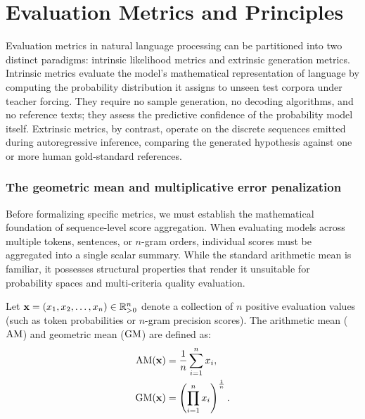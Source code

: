 \documentclass[../../main.tex]{subfiles}
\begin{document}
\section{Evaluation Metrics and Principles}
\label{sec:evaluation_metrics}

Evaluation metrics in natural language processing can be partitioned into two distinct paradigms: intrinsic likelihood metrics and extrinsic generation metrics. Intrinsic metrics evaluate the model's mathematical representation of language by computing the probability distribution it assigns to unseen test corpora under teacher forcing. They require no sample generation, no decoding algorithms, and no reference texts; they assess the predictive confidence of the probability model itself. Extrinsic metrics, by contrast, operate on the discrete sequences emitted during autoregressive inference, comparing the generated hypothesis against one or more human gold-standard references.

\subsubsection{The geometric mean and multiplicative error penalization}
Before formalizing specific metrics, we must establish the mathematical foundation of sequence-level score aggregation. When evaluating models across multiple tokens, sentences, or $n$-gram orders, individual scores must be aggregated into a single scalar summary. While the standard arithmetic mean is familiar, it possesses structural properties that render it unsuitable for probability spaces and multi-criteria quality evaluation.

Let $\mathbf{x} = (x_1, x_2, \dots, x_n) \in \mathbb{R}_{>0}^n$ denote a collection of $n$ positive evaluation values (such as token probabilities or $n$-gram precision scores). The arithmetic mean ($\mathrm{AM}$) and geometric mean ($\mathrm{GM}$) are defined as:
\begin{align}
\label{eq:arithmetic_mean_def}
\mathrm{AM}(\mathbf{x}) &= \frac{1}{n} \sum_{i=1}^n x_i, \\
\label{eq:geometric_mean_def}
\mathrm{GM}(\mathbf{x}) &= \left( \prod_{i=1}^n x_i \right)^{\frac{1}{n}}.
\end{align}
\end{document}

